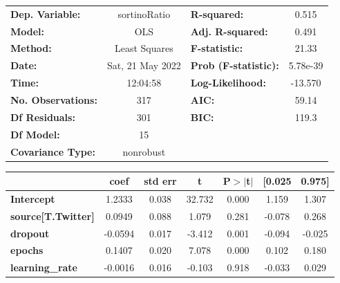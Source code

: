 \begin{center}
\begin{tabular}{lclc}
\toprule
\textbf{Dep. Variable:}              &   sortinoRatio   & \textbf{  R-squared:         } &     0.515   \\
\textbf{Model:}                      &       OLS        & \textbf{  Adj. R-squared:    } &     0.491   \\
\textbf{Method:}                     &  Least Squares   & \textbf{  F-statistic:       } &     21.33   \\
\textbf{Date:}                       & Sat, 21 May 2022 & \textbf{  Prob (F-statistic):} &  5.78e-39   \\
\textbf{Time:}                       &     12:04:58     & \textbf{  Log-Likelihood:    } &   -13.570   \\
\textbf{No. Observations:}           &         317      & \textbf{  AIC:               } &     59.14   \\
\textbf{Df Residuals:}               &         301      & \textbf{  BIC:               } &     119.3   \\
\textbf{Df Model:}                   &          15      & \textbf{                     } &             \\
\textbf{Covariance Type:}            &    nonrobust     & \textbf{                     } &             \\
\bottomrule
\end{tabular}
\begin{tabular}{lcccccc}
                                     & \textbf{coef} & \textbf{std err} & \textbf{t} & \textbf{P$> |$t$|$} & \textbf{[0.025} & \textbf{0.975]}  \\
\midrule
\textbf{Intercept}                   &       1.2333  &        0.038     &    32.732  &         0.000        &        1.159    &        1.307     \\
\textbf{source[T.Twitter]}           &       0.0949  &        0.088     &     1.079  &         0.281        &       -0.078    &        0.268     \\
\textbf{dropout}                     &      -0.0594  &        0.017     &    -3.412  &         0.001        &       -0.094    &       -0.025     \\
\textbf{epochs}                      &       0.1407  &        0.020     &     7.078  &         0.000        &        0.102    &        0.180     \\
\textbf{learning\_rate}              &      -0.0016  &        0.016     &    -0.103  &         0.918        &       -0.033    &        0.029     \\

\end{tabular}
\end{center}
